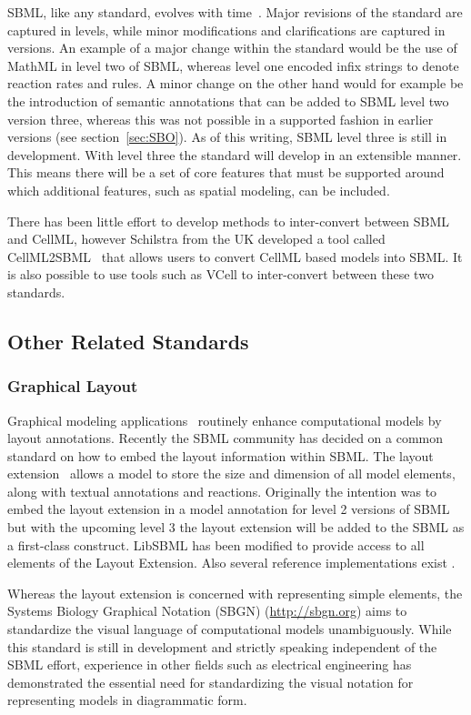 \documentclass[12pt]{article}
\begin{document}
SBML, like any standard, evolves with time~\citep{Finney2003}. Major
revisions of the standard are captured in levels, while minor
modifications and clarifications are captured in versions. An
example of a major change within the standard would be the use of
MathML in level two of SBML, whereas level one encoded infix strings
to denote reaction rates and rules. A minor change on the other hand
would for example be the introduction of semantic annotations that
can be added to SBML level two version three, whereas this was not
possible in a supported fashion in earlier versions (see
section~\ref{sec:SBO}). As of this writing, SBML level three is
still in development. With level three the standard will develop in
an extensible manner. This means there will be a set of core
features that must be supported around which additional features,
such as spatial modeling, can be included.

There has been little effort to develop methods to inter-convert
between SBML and CellML, however Schilstra from the UK developed a
tool called CellML2SBML~\citep{Schilstra:2006} that allows users to
convert CellML based models into SBML. It is also possible to use
tools such as VCell to inter-convert between these two standards.


\subsection{Other Related Standards}

\subsubsection{Graphical Layout}

Graphical modeling applications~\citep{BergmannCP:2006} routinely
enhance computational models by layout annotations. Recently the
SBML community has decided on a common standard on how to embed the
layout information within SBML. The layout
extension~\citep{Guages2006} allows a model to store the size and
dimension of all model elements, along with textual annotations and
reactions. Originally the intention was to embed the layout
extension in a model annotation for level 2 versions of SBML but
with the upcoming level 3 the layout extension will be added to the
SBML as a first-class construct. LibSBML has been modified to
provide access to all elements of the Layout Extension. Also several
reference implementations exist \citep{BergmannCP:2006,Deckard2007}.

Whereas the layout extension is concerned with representing simple
elements, the Systems Biology Graphical Notation (SBGN)
(\url{http://sbgn.org}) aims to standardize the visual language of
computational models unambiguously. While this standard is still in
development and strictly speaking independent of the SBML effort,
experience in other fields such as electrical engineering has
demonstrated the essential need for standardizing the visual
notation for representing models in diagrammatic form.
\end{document}
